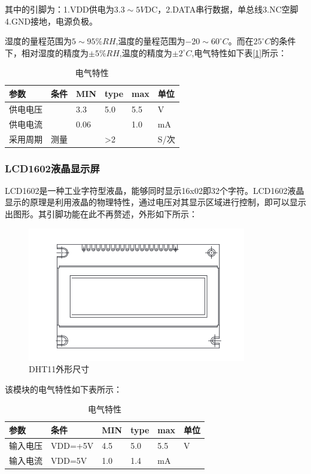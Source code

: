 \documentclass[a4paper, 11pt]{article} %
\begin{document}
\par{}其中的引脚为：1.VDD供电为$3.3\sim 5V$DC，2.DATA串行数据，单总线3.NC空脚4.GND接地，电源负极。
\par{} 湿度的量程范围为$5\sim 95 \%RH$,温度的量程范围为$-20\sim 60^{\circ}C$。而在$25^{\circ}C$的条件下，相对湿度的精度为$\pm 5\%RH$,温度的精度为$\pm 2^{\circ}C$,电气特性如下表[\ref{tab3}]所示：
\begin{table}[H]
  \centering
  \caption{电气特性}
  \label{tab3}
  \begin{threeparttable}
    \small
    \begin{tabular} {p{70pt}p{70pt}p{70pt}p{70pt}p{70pt}p{70pt}}
      \hline
      参数&条件&MIN&type&max&单位\\
      \hline
      供电电压&&3.3&5.0&5.5&V\\
      供电电流&&0.06&&1.0&mA\\
      采用周期&测量&&>2&&S/次\\
      \hline
    \end{tabular}
    \small
  \end{threeparttable}
\end{table}

\subsubsection{LCD1602液晶显示屏}
\par{} LCD1602是一种工业字符型液晶，能够同时显示16x02即32个字符。LCD1602液晶显示的原理是利用液晶的物理特性，通过电压对其显示区域进行控制，即可以显示出图形。其引脚功能在此不再赘述，外形如下所示：

\begin{figure}[H]
  \centering
  \includegraphics[scale = 0.58 ]{1-8.png}
  \caption{DHT11外形尺寸}
  \label{img9} 
\end{figure}

\par{} 该模块的电气特性如下表所示：
\begin{table}[H]
  \centering
  \caption{电气特性}
  \label{tab4}
  \begin{threeparttable}
    \small
    \begin{tabular} {p{70pt}p{70pt}p{70pt}p{70pt}p{70pt}p{70pt}}
      \hline
      参数&条件&MIN&type&max&单位\\
      \hline
      输入电压&VDD=+5V&4.5&5.0&5.5&V\\
      输入电流&VDD=5V&1.0&1.4&mA\\
      \hline
    \end{tabular}
    \small
  \end{threeparttable}
\end{table}
\end{document}
